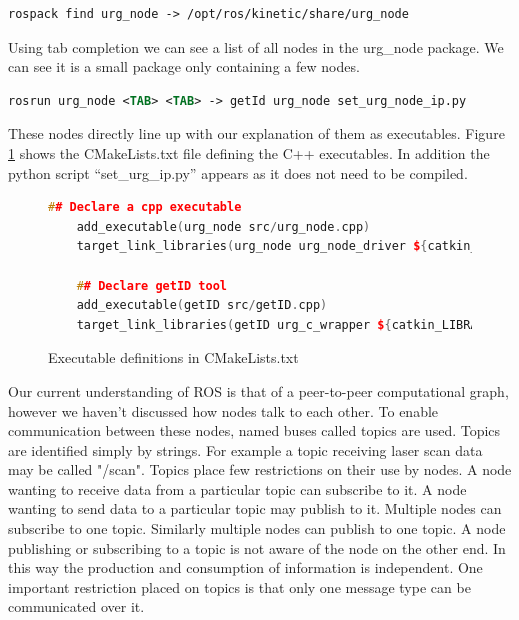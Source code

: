 \documentclass[capstone_report.tex]{subfiles}
\begin{document}
\begin{lstlisting}[language=xml]
    rospack find urg_node -> /opt/ros/kinetic/share/urg_node
\end{lstlisting}

Using tab completion we can see a list of all nodes in the urg\_node package.  We can see it is a small package only containing a few nodes.

\begin{lstlisting}[language=xml]
    rosrun urg_node <TAB> <TAB> -> getId urg_node set_urg_node_ip.py
\end{lstlisting}

These nodes directly line up with our explanation of them as executables.  Figure \ref{fig:executable} shows the CMakeLists.txt file defining the C++ executables.  In addition the python script “set\_urg\_ip.py” appears as it does not need to be compiled.

\begin{figure}[H]
    \begin{lstlisting}[language=c++]
    ## Declare a cpp executable
    add_executable(urg_node src/urg_node.cpp)
    target_link_libraries(urg_node urg_node_driver ${catkin_LIBRARIES})

    ## Declare getID tool
    add_executable(getID src/getID.cpp)
    target_link_libraries(getID urg_c_wrapper ${catkin_LIBRARIES})
    \end{lstlisting}
    \caption{Executable definitions in CMakeLists.txt}
    \label{fig:executable}
\end{figure}

Our current understanding of ROS is that of a peer-to-peer computational graph, however we haven't discussed how nodes talk to each other.  To enable communication between these nodes, named buses called topics are used.  Topics are identified simply by strings.  For example a topic receiving laser scan data may be called "/scan".  Topics place few restrictions on their use by nodes.  A node wanting to receive data from a particular topic can subscribe to it.  A node wanting to send data to a particular topic may publish to it.  Multiple nodes can subscribe to one topic.  Similarly multiple nodes can publish to one topic.  A node publishing or subscribing to a topic is not aware of the node on the other end.  In this way the production and consumption of information is independent.   One important restriction placed on topics is that only one message type can be communicated over it.\\
\end{document}
